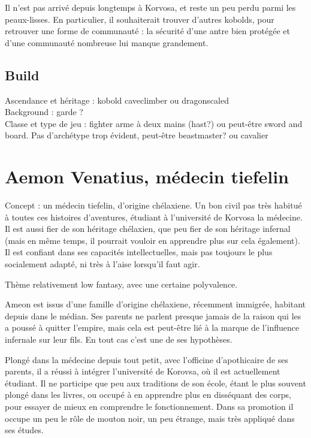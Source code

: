 \documentclass[10pt,a4paper]{book}
\begin{document}
Il n'est pas arrivé depuis longtemps à Korvosa, et reste un peu perdu parmi les peaux-lisses. En particulier, il souhaiterait trouver d'autres kobolds, pour retrouver une forme de communauté : la sécurité d'une antre bien protégée et d'une communauté nombreuse lui manque grandement.

\subsection{Build}
Ascendance et héritage : kobold caveclimber ou dragonscaled\\
Background : garde ?\\
Classe et type de jeu : fighter arme à deux mains (hast?) ou peut-être sword and board. Pas d'archétype trop évident, peut-être beastmaster? ou cavalier \\

\section{Aemon Venatius, médecin tiefelin}

Concept : un médecin tiefelin, d'origine chélaxiene. Un bon civil pas très habitué à toutes ces histoires d'aventures, étudiant à l'université de Korvosa la médecine. Il est aussi fier de son héritage chélaxien, que peu fier de son héritage infernal (mais en même temps, il pourrait vouloir en apprendre plus sur cela également). Il est confiant dans ses capacités intellectuelles, mais pas toujours le plus socialement adapté, ni très à l'aise lorsqu'il faut agir. 

Thème relativement low fantasy, avec une certaine polyvalence.

Ameon est issus d'une famille d'origine chélaxiene, récemment immigrée, habitant depuis dans le médian. Ses parents ne parlent presque jamais de la raison qui les a poussé à quitter l'empire, mais cela est peut-être lié à la marque de l'influence infernale sur leur fils. En tout cas c'est une de ses hypothèses.

Plongé dans la médecine depuis tout petit, avec l'officine d'apothicaire de ses parents, il a réussi à intégrer l'université de Korovsa, où il est actuellement étudiant. Il ne participe que peu aux traditions de son école, étant le plus souvent plongé dans les livres, ou occupé à en apprendre plus en disséquant des corps, pour essayer de mieux en comprendre le fonctionnement. Dans sa promotion il occupe un peu le rôle de mouton noir, un peu étrange, mais très appliqué dans ses études.
\end{document}
